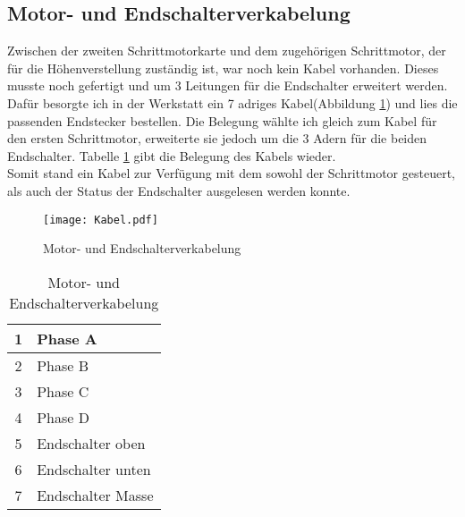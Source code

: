 \subsection{Motor- und Endschalterverkabelung}
Zwischen der zweiten Schrittmotorkarte und dem zugehörigen Schrittmotor, der für die Höhenverstellung zuständig ist, war noch kein Kabel vorhanden. Dieses musste noch gefertigt und um 3 Leitungen für die Endschalter erweitert werden.\\
Dafür besorgte ich in der Werkstatt ein 7 adriges Kabel(Abbildung \ref{fig:Motorverkabelung}) und lies die passenden Endstecker bestellen. Die Belegung wählte ich gleich zum Kabel für den ersten Schrittmotor, erweiterte sie jedoch um die 3 Adern für die beiden Endschalter. Tabelle \ref{tab:Motorverkabelung} gibt die Belegung des Kabels wieder.\\
Somit stand ein Kabel zur Verfügung mit dem sowohl der Schrittmotor gesteuert, als auch der Status der Endschalter ausgelesen werden konnte.
\begin{figure}[h]
\centering
\texttt{[image: Kabel.pdf]}
\caption{Motor- und Endschalterverkabelung}
\label{fig:Motorverkabelung}
\end{figure}
\begin{longtable}{|c|l|} 
\caption{Motor- und Endschalterverkabelung} \\
\hline
\label{tab:Motorverkabelung}
1 & Phase A \\ 
\hline 
2 & Phase B \\ 
\hline 
3 & Phase C \\ 
\hline 
4 & Phase D \\ 
\hline 
5 & Endschalter oben \\ 
\hline 
6 & Endschalter unten \\ 
\hline 
7 & Endschalter Masse \\ 
\hline 
\end{longtable} 

